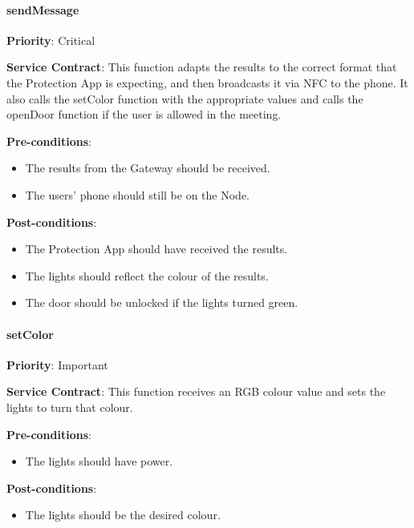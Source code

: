         \paragraph{sendMessage}
			\begin{description}
			    \item{\textbf{Priority}:} Critical%
			    \item{\textbf{Service Contract}:} This function adapts the results to the correct format that the Protection App is expecting, and then broadcasts it via NFC to the phone. It also calls the setColor function with the appropriate values and calls the openDoor function if the user is allowed in the meeting.
			    \item{\textbf{Pre-conditions}:}%
    			    \begin{itemize}
    			        \item The results from the Gateway should be received.
    			        \item The users' phone should still be on the Node.
    			    \end{itemize}
			    \item{\textbf{Post-conditions}:} %
    			    \begin{itemize}
    			        \item The Protection App should have received the results.
    			        \item The lights should reflect the colour of the results.
    			        \item The door should be unlocked if the lights turned green.
    			    \end{itemize}
			\end{description}
		
        \paragraph{setColor}
			\begin{description}
			    \item{\textbf{Priority}:} Important%
			    \item{\textbf{Service Contract}:} This function receives an RGB colour value and sets the lights to turn that colour. 
			    \item{\textbf{Pre-conditions}:}%
    			    \begin{itemize}
    			        \item The lights should have power.
    			    \end{itemize}
			    \item{\textbf{Post-conditions}:} %
    			    \begin{itemize}
    			        \item The lights should be the desired colour.
    			    \end{itemize}
			\end{description}
			
